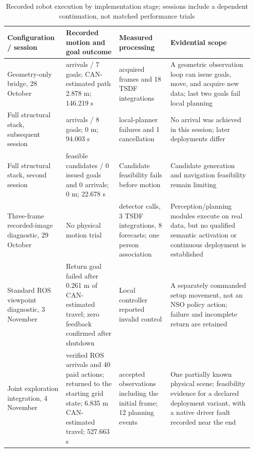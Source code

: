 \documentclass[11pt,a4paper]{article}
\newlength{\JournalTableWidth}
\begin{document}
\begin{table}[!htbp]
\caption{Recorded robot execution by implementation stage; sessions include a dependent continuation, not matched performance trials}\label{tab:7}
\small\renewcommand{\arraystretch}{1.12}\setlength{\tabcolsep}{3pt}
\setlength{\JournalTableWidth}{\dimexpr\linewidth-6\tabcolsep\relax}
\begin{tabular}{@{}>{\raggedright\arraybackslash}p{0.22\JournalTableWidth} >{\raggedright\arraybackslash}p{0.24\JournalTableWidth} >{\raggedright\arraybackslash}p{0.24\JournalTableWidth} >{\raggedright\arraybackslash}p{0.3\JournalTableWidth}@{}}
\toprule
Configuration / session & Recorded motion and goal outcome & Measured processing & Evidential scope \\
\midrule
Geometry-only bridge, 28 October & 5 arrivals / 7 goals; CAN-estimated path 2.878 m; 146.219 s & 18 acquired frames and 18 TSDF integrations & A geometric observation loop can issue goals, move, and acquire new data; last two goals fail local planning \\
Full structural stack, subsequent session & 0 arrivals / 8 goals; 0 m; 94.003 s & 7 local-planner failures and 1 cancellation & No arrival was achieved in this session; later deployments differ \\
Full structural stack, second session & 0 feasible candidates / 0 issued goals and 0 arrivals; 0 m; 22.678 s & Candidate feasibility fails before motion & Candidate generation and navigation feasibility remain limiting \\
Three-frame recorded-image diagnostic, 29 October & No physical motion trial & 3 detector calls, 3 TSDF integrations, 8 forecasts; one person association & Perception/planning modules execute on real data, but no qualified semantic activation or continuous deployment is established \\
Standard ROS viewpoint diagnostic, 3 November & Return goal failed after 0.261 m of CAN-estimated travel; zero feedback confirmed after shutdown & Local controller reported invalid control & A separately commanded setup movement, not an NSO policy action; failure and incomplete return are retained \\
Joint exploration integration, 4 November & 40 verified ROS arrivals and 40 paid actions; returned to the starting grid state; 6.835 m CAN-estimated travel; 527.663 s & 41 accepted observations including the initial frame; 12 planning events & One partially known physical scene; feasibility evidence for a declared deployment variant, with a native driver fault recorded near the end \\

\end{tabular}
\end{table}
\end{document}
